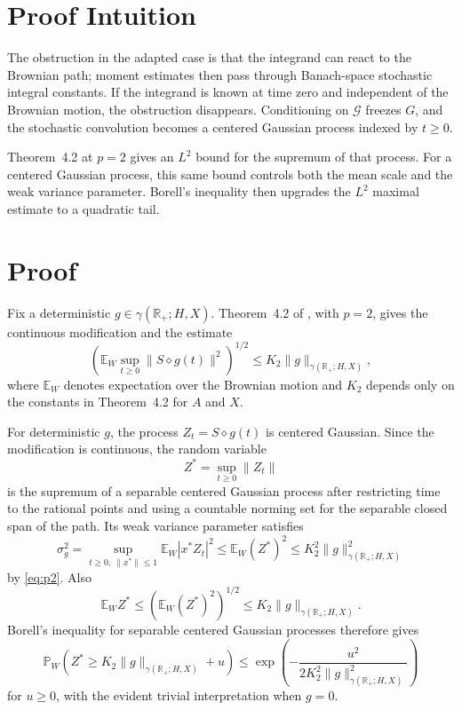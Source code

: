 \documentclass[11pt]{article}
\newcommand{\R}{\mathbb R}
\newcommand{\E}{\mathbb E}
\newcommand{\Pp}{\mathbb P}
\newcommand{\G}{\mathcal G}
\newcommand{\gam}{\gamma}
\begin{document}
\section*{Proof Intuition}

The obstruction in the adapted case is that the integrand can react to the
Brownian path; moment estimates then pass through Banach-space stochastic
integral constants.  If the integrand is known at time zero and independent
of the Brownian motion, the obstruction disappears.  Conditioning on \(\G\)
freezes \(G\), and the stochastic convolution becomes a centered Gaussian
process indexed by \(t\ge0\).

Theorem~4.2 at \(p=2\) gives an \(L^2\) bound for the supremum of that process.
For a centered Gaussian process, this same bound controls both the mean scale
and the weak variance parameter.  Borell's inequality then upgrades the
\(L^2\) maximal estimate to a quadratic tail.

\section*{Proof}

Fix a deterministic \(g\in\gam(\R_+;H,X)\).  Theorem~4.2 of \cite{VW1004},
with \(p=2\), gives the continuous modification and the estimate
\begin{equation}
\label{eq:p2}
 \left(\E_W\sup_{t\ge0}\|S\diamond g(t)\|^2\right)^{1/2}
 \le K_2\|g\|_{\gam(\R_+;H,X)} ,
\end{equation}
where \(\E_W\) denotes expectation over the Brownian motion and \(K_2\)
depends only on the constants in Theorem~4.2 for \(A\) and \(X\).

For deterministic \(g\), the process \(Z_t=S\diamond g(t)\) is centered
Gaussian.  Since the modification is continuous, the random variable
\[
        Z^*=\sup_{t\ge0}\|Z_t\|
\]
is the supremum of a separable centered Gaussian process after restricting
time to the rational points and using a countable norming set for the
separable closed span of the path.  Its weak variance parameter satisfies
\[
  \sigma_g^2
  =\sup_{t\ge0,\ \|x^*\|\le1}\E_W|x^*Z_t|^2
  \le \E_W (Z^*)^2
  \le K_2^2\|g\|_{\gam(\R_+;H,X)}^2
\]
by \eqref{eq:p2}.  Also
\[
        \E_W Z^*\le \left(\E_W (Z^*)^2\right)^{1/2}
        \le K_2\|g\|_{\gam(\R_+;H,X)} .
\]
Borell's inequality for separable centered Gaussian processes therefore gives
\[
  \Pp_W\!\left(
      Z^*\ge K_2\|g\|_{\gam(\R_+;H,X)}+u
    \right)
  \le
  \exp\!\left(
      -\frac{u^2}{2K_2^2\|g\|_{\gam(\R_+;H,X)}^2}
    \right)
\]
for \(u\ge0\), with the evident trivial interpretation when \(g=0\).
\end{document}
